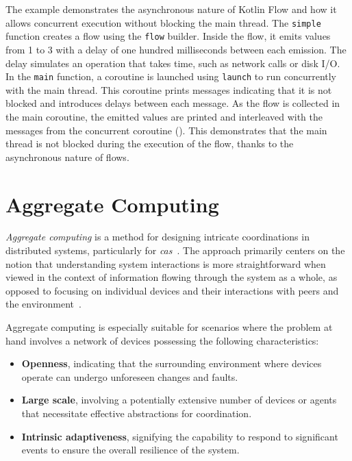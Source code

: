 The example  demonstrates the asynchronous nature of Kotlin Flow and how it allows concurrent execution without blocking the main thread. The \texttt{simple} function creates a flow using the \texttt{flow} builder. Inside the flow, it emits values from 1 to 3 with a delay of one hundred milliseconds between each emission. The delay simulates an operation that takes time, such as network calls or disk I/O. In the \texttt{main} function, a coroutine is launched using \texttt{launch} to run concurrently with the main thread. This coroutine prints messages indicating that it is not blocked and introduces delays between each message. As the flow is collected in the main coroutine, the emitted values are printed and interleaved with the messages from the concurrent coroutine (). This demonstrates that the main thread is not blocked during the execution of the flow, thanks to the asynchronous nature of flows.

\section{Aggregate Computing}
\label{section:aggregate-computing}

\textit{Aggregate computing} is a method for designing intricate coordinations in distributed systems, particularly for \textit{\ac{cas}}~\cite{Ferscha2015}. The approach primarily centers on the notion that understanding system interactions is more straightforward when viewed in the context of information flowing through the system as a whole, as opposed to focusing on individual devices and their interactions with peers and the environment~\cite{Viroli2019}.

Aggregate computing is especially suitable for scenarios where the problem at hand involves a network of devices possessing the following characteristics:

\begin{itemize}
    \item \textbf{Openness}, indicating that the surrounding environment where devices operate can undergo unforeseen changes and faults.
    \item \textbf{Large scale}, involving a potentially extensive number of devices or agents that necessitate effective abstractions for coordination.
    \item \textbf{Intrinsic adaptiveness}, signifying the capability to respond to significant events to ensure the overall resilience of the system.
\end{itemize}

